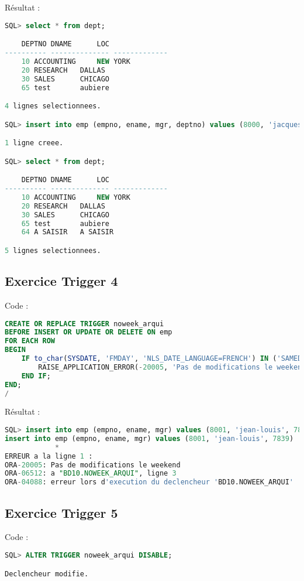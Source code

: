 \documentclass{article}
\begin{document}
Résultat :
\begin{lstlisting}[language=SQL,
    morekeywords={DECLARE, LOOP, TYPE, FOR, IF, IS, OPEN, FETCH, DBMS_OUTPUT, PUT_LINE}]
SQL> select * from dept;

    DEPTNO DNAME	  LOC
---------- -------------- -------------
	10 ACCOUNTING	  NEW YORK
	20 RESEARCH	  DALLAS
	30 SALES	  CHICAGO
	65 test 	  aubiere

4 lignes selectionnees.

SQL> insert into emp (empno, ename, mgr, deptno) values (8000, 'jacques', 7839, 64);

1 ligne creee.

SQL> select * from dept; 

    DEPTNO DNAME	  LOC
---------- -------------- -------------
	10 ACCOUNTING	  NEW YORK
	20 RESEARCH	  DALLAS
	30 SALES	  CHICAGO
	65 test 	  aubiere
	64 A SAISIR	  A SAISIR

5 lignes selectionnees.
\end{lstlisting}

\subsection{Exercice Trigger 4}
Code :
\begin{lstlisting}[language=SQL,
    deletekeywords={char},
    morekeywords={DECLARE, LOOP, TYPE, FOR, IF, IS, OPEN, FETCH, DBMS_OUTPUT, PUT_LINE}]
CREATE OR REPLACE TRIGGER noweek_arqui
BEFORE INSERT OR UPDATE OR DELETE ON emp
FOR EACH ROW
BEGIN
    IF to_char(SYSDATE, 'FMDAY', 'NLS_DATE_LANGUAGE=FRENCH') IN ('SAMEDI', 'DIMANCHE') THEN
        RAISE_APPLICATION_ERROR(-20005, 'Pas de modifications le weekend');
    END IF;
END;
/    
\end{lstlisting}

Résultat :
\begin{lstlisting}[language=SQL,
    morekeywords={DECLARE, LOOP, TYPE, FOR, IF, IS, OPEN, FETCH, DBMS_OUTPUT, PUT_LINE}]
SQL> insert into emp (empno, ename, mgr) values (8001, 'jean-louis', 7839);                         
insert into emp (empno, ename, mgr) values (8001, 'jean-louis', 7839)
            *
ERREUR a la ligne 1 :
ORA-20005: Pas de modifications le weekend
ORA-06512: a "BD10.NOWEEK_ARQUI", ligne 3
ORA-04088: erreur lors d'execution du declencheur 'BD10.NOWEEK_ARQUI'
\end{lstlisting}

\subsection{Exercice Trigger 5}
Code :
\begin{lstlisting}[language=SQL,
    deletekeywords={char},
    morekeywords={DECLARE, LOOP, TYPE, FOR, IF, IS, OPEN, FETCH, DBMS_OUTPUT, PUT_LINE}]
SQL> ALTER TRIGGER noweek_arqui DISABLE;

Declencheur modifie.
\end{lstlisting}
\end{document}
